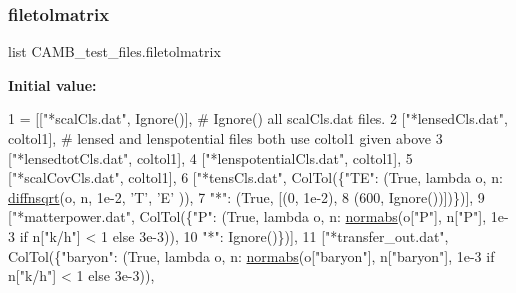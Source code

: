 \mbox{\label{namespaceCAMB__test__files_a325a83c6a5bc77af11b528f15bb821e0}} 
\subsubsection{\texorpdfstring{filetolmatrix}{filetolmatrix}}
{\footnotesize\ttfamily list C\+A\+M\+B\+\_\+test\+\_\+files.\+filetolmatrix}

{\bfseries Initial value\+:}
\begin{DoxyCode}
1 =  [[\textcolor{stringliteral}{"*scalCls.dat"}, Ignore()],  \textcolor{comment}{# Ignore() all scalCls.dat files.}
2                  [\textcolor{stringliteral}{"*lensedCls.dat"}, coltol1],  \textcolor{comment}{# lensed and lenspotential files both use coltol1 given
       above}
3                  [\textcolor{stringliteral}{"*lensedtotCls.dat"}, coltol1],
4                  [\textcolor{stringliteral}{"*lenspotentialCls.dat"}, coltol1],
5                  [\textcolor{stringliteral}{"*scalCovCls.dat"}, coltol1],
6                  [\textcolor{stringliteral}{"*tensCls.dat"}, ColTol(\{\textcolor{stringliteral}{"TE"}: (\textcolor{keyword}{True}, \textcolor{keyword}{lambda} o, n: \mbox{\hyperlink{namespaceCAMB__test__files_a64d237c051d366401dcdc40415829dca}{diffnsqrt}}(o, n, 1e-2, \textcolor{stringliteral}{'T'}, \textcolor{stringliteral}{'E'}
      )),
7                                           \textcolor{stringliteral}{"*"}: (\textcolor{keyword}{True}, [(0, 1e-2),
8                                                 (600, Ignore())])\})],
9                  [\textcolor{stringliteral}{"*matterpower.dat"}, ColTol(\{\textcolor{stringliteral}{"P"}: (\textcolor{keyword}{True}, \textcolor{keyword}{lambda} o, n: \mbox{\hyperlink{namespaceCAMB__test__files_a942fd27486efa4cad8f9592101d8d6b4}{normabs}}(o[\textcolor{stringliteral}{"P"}], n[\textcolor{stringliteral}{"P"}], 1e-3 \textcolor{keywordflow}{
      if} n[\textcolor{stringliteral}{"k/h"}] < 1 \textcolor{keywordflow}{else} 3e-3)),
10                                               \textcolor{stringliteral}{"*"}: Ignore()\})],
11                  [\textcolor{stringliteral}{"*transfer\_out.dat"}, ColTol(\{\textcolor{stringliteral}{"baryon"}: (\textcolor{keyword}{True}, \textcolor{keyword}{lambda} o, n: 
      \mbox{\hyperlink{namespaceCAMB__test__files_a942fd27486efa4cad8f9592101d8d6b4}{normabs}}(o[\textcolor{stringliteral}{"baryon"}], n[\textcolor{stringliteral}{"baryon"}], 1e-3 \textcolor{keywordflow}{if} n[\textcolor{stringliteral}{"k/h"}] < 1 \textcolor{keywordflow}{else} 3e-3)),

\end{DoxyCode}
